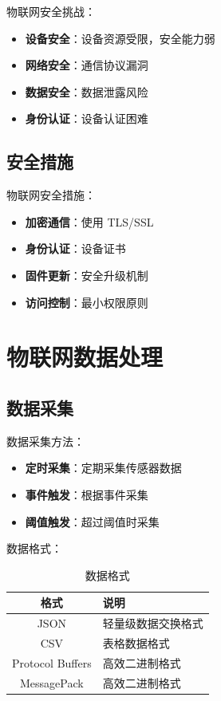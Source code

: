 \documentclass[12pt,UTF8]{ctexbook}
\begin{document}
物联网安全挑战：
\begin{itemize}
    \item \textbf{设备安全}：设备资源受限，安全能力弱
    \item \textbf{网络安全}：通信协议漏洞
    \item \textbf{数据安全}：数据泄露风险
    \item \textbf{身份认证}：设备认证困难
\end{itemize}

\section{安全措施}
\label{sec:security_measures}

物联网安全措施：
\begin{itemize}
    \item \textbf{加密通信}：使用 TLS/SSL
    \item \textbf{身份认证}：设备证书
    \item \textbf{固件更新}：安全升级机制
    \item \textbf{访问控制}：最小权限原则
\end{itemize}

\chapter{物联网数据处理}
\label{chap:data_processing}

\section{数据采集}
\label{sec:data_collection}

数据采集方法：
\begin{itemize}
    \item \textbf{定时采集}：定期采集传感器数据
    \item \textbf{事件触发}：根据事件采集
    \item \textbf{阈值触发}：超过阈值时采集
\end{itemize}

数据格式：
\begin{table}[htbp]
    \centering
    \caption{数据格式}
    \begin{tabular}{|c|p{8cm}|}
        \hline
        \textbf{格式} & \textbf{说明} \\
        \hline
        JSON & 轻量级数据交换格式 \\
        \hline
        CSV & 表格数据格式 \\
        \hline
        Protocol Buffers & 高效二进制格式 \\
        \hline
        MessagePack & 高效二进制格式 \\
        \hline
    \end{tabular}
\end{table}
\end{document}

